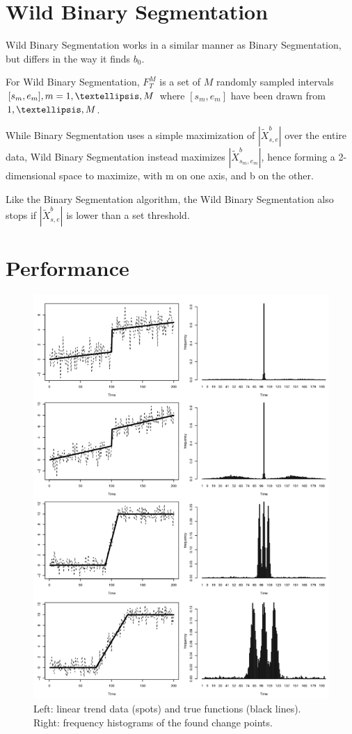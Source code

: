 \documentclass[%
 reprint,
 amsmath,amssymb,
 aps,
]{revtex4-1}
\begin{document}
\section{Wild Binary Segmentation}
Wild Binary Segmentation works in a similar manner as Binary Segmentation, but differs in the way it finds \(b_0\).

For Wild Binary Segmentation, \(F_T^M\) is a set of $M$ randomly sampled intervals $[s_m,e_m], m=1,\textellipsis,M$ where $[s_m,e_m]$ have been drawn from ${1,\textellipsis, M}$.

While Binary Segmentation uses a simple maximization of \( |\tilde{X}^{b}_{s,e}| \) over the entire data, Wild Binary Segmentation instead maximizes
\( |\tilde{X}^{b}_{s_m,e_m}| \), hence forming a 2-dimensional space to maximize, with m on one axis, and b on the other.

Like the Binary Segmentation algorithm, the Wild Binary Segmentation also stops if \( |\tilde{X}^{b}_{s,e}| \) is lower than a set threshold.



\section{Performance}

\begin{figure}[t!]
  \includegraphics[width=\linewidth]{traces.png}
  \caption{
  Left: linear trend data (spots) and true functions (black lines).
  Right: frequency histograms of the found change points.
  }
  \label{traces}
\end{figure}
\end{document}
